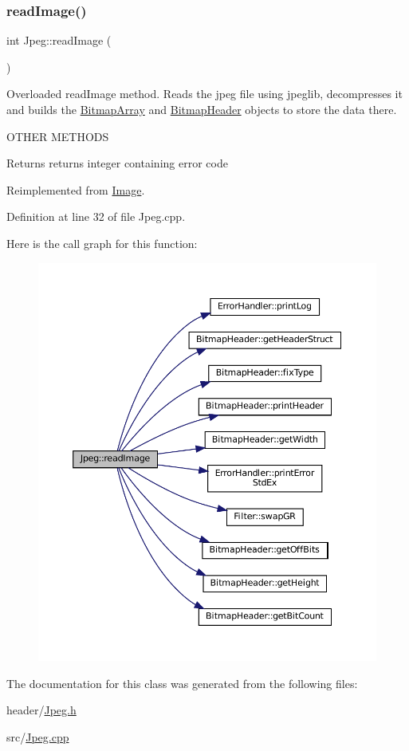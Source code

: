 \subsubsection{\texorpdfstring{readImage()}{readImage()}}
{\footnotesize\ttfamily int Jpeg\+::read\+Image (\begin{DoxyParamCaption}{ }\end{DoxyParamCaption})\hspace{0.3cm}{\ttfamily [virtual]}}



Overloaded read\+Image method. Reads the jpeg file using jpeglib, decompresses it and builds the \mbox{\hyperlink{classBitmapArray}{Bitmap\+Array}} and \mbox{\hyperlink{classBitmapHeader}{Bitmap\+Header}} objects to store the data there. 

O\+T\+H\+ER M\+E\+T\+H\+O\+DS\begin{DoxyReturn}{Returns}
returns integer containing error code 
\end{DoxyReturn}


Reimplemented from \mbox{\hyperlink{classImage_ac0aa1f41cb368d87b20dd38839218d93}{Image}}.



Definition at line 32 of file Jpeg.\+cpp.

Here is the call graph for this function\+:\nopagebreak
\begin{figure}[H]
\begin{center}
\leavevmode
\includegraphics[width=350pt]{classJpeg_a80db9e22efc544e32145b6743b2b407c_cgraph}
\end{center}
\end{figure}


The documentation for this class was generated from the following files\+:\begin{DoxyCompactItemize}
\item 
header/\mbox{\hyperlink{Jpeg_8h}{Jpeg.\+h}}\item 
src/\mbox{\hyperlink{Jpeg_8cpp}{Jpeg.\+cpp}}\end{DoxyCompactItemize}

